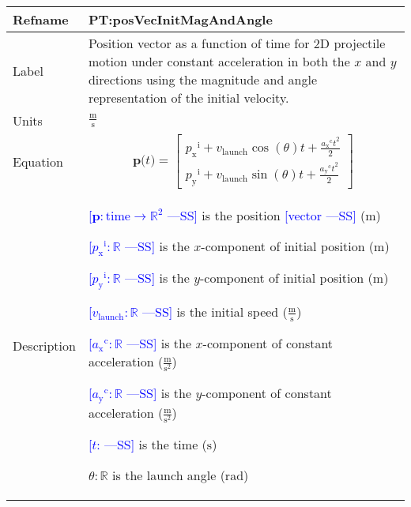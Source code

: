 \documentclass[12pt]{article}
\newcommand{\authornote}[3]{\textcolor{#1}{[#3 ---#2]}}
\newcommand{\authornote}[3]{}
\newcommand{\wss}[1]{\authornote{blue}{SS}{#1}}
\begin{document}
\noindent
\begin{minipage}{\textwidth}
\begin{tabular}{>{\raggedright}p{}>{\raggedright\arraybackslash}p{}}
\toprule \textbf{Refname} & \textbf{PT:posVecInitMagAndAngle}
\label{PT:posVecInitMagAndAngle}
\\ \midrule
Label & Position vector as a function of time for 2D projectile motion under
constant acceleration in both the $x$ and $y$ directions using the magnitude and
angle representation of the initial velocity.
        
\\ \midrule
Units & $\frac{\text{m}}{\text{s}}$
        
\\ \midrule
Equation & \begin{displaymath}
           \symbf{p}\text{(}t\text{)}=\begin{bmatrix}
                                      {{p_{\text{x}}}^{\text{i}}}+{v}_{\text{launch}} \cos(\theta) t +\frac{{{a_{\text{x}}}^{\text{c}}} t^{2}}{2}\\
                                      {{p_{\text{y}}}^{\text{i}}}+{v}_{\text{launch}} \sin(\theta) t +\frac{{{a_{\text{y}}}^{\text{c}}} t^{2}}{2}
                                      \end{bmatrix}
           \end{displaymath}
\\ \midrule
Description & \begin{symbDescription}
              \item{\wss{$\symbf{p}: \text{time} \rightarrow \mathbb{R}^2$} is the position \wss{vector} (${\text{m}}$)}
              \item{\wss{${{p_{\text{x}}}^{\text{i}}}: \mathbb{R}$} is the $x$-component of initial position (${\text{m}}$)}
              \item{\wss{${{p_{\text{y}}}^{\text{i}}}: \mathbb{R}$} is the $y$-component of initial position (${\text{m}}$)}
              \item{\wss{${{v}_{\text{launch}}}: \mathbb{R}$} is the initial speed ($\frac{\text{m}}{\text{s}}$)}
              \item{\wss{${{a_{\text{x}}}^{\text{c}}}: \mathbb{R}$} is the $x$-component of constant acceleration ($\frac{\text{m}}{\text{s}^{2}}$)}
              \item{\wss{${{a_{\text{y}}}^{\text{c}}}: \mathbb{R}$} is the $y$-component of constant acceleration ($\frac{\text{m}}{\text{s}^{2}}$)}
              \item{\wss{$t$: \text{time}} is the time (${\text{s}}$)}
              \item $\theta: \mathbb{R}$ is the launch angle (rad)
              \end{symbDescription}


\end{tabular}
\end{minipage}
\end{document}
